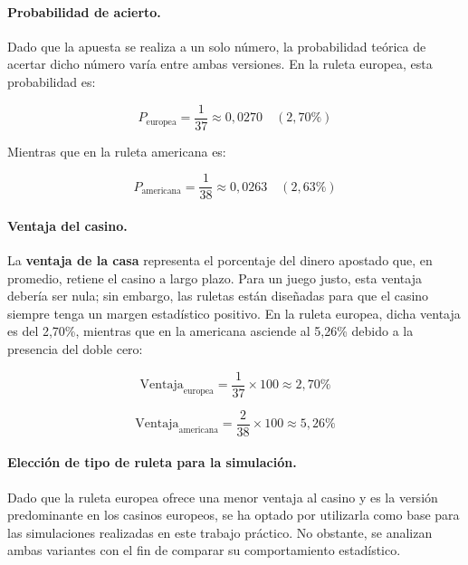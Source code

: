 \documentclass{article}
\begin{document}
\paragraph{Probabilidad de acierto.}
Dado que la apuesta se realiza a un solo número, la probabilidad teórica de acertar dicho número varía entre ambas versiones. En la ruleta europea, esta probabilidad es:

\begin{equation}
    P_{\text{europea}} = \frac{1}{37} \approx 0{,}0270 \quad (2{,}70\%)
\end{equation}

Mientras que en la ruleta americana es:

\begin{equation}
    P_{\text{americana}} = \frac{1}{38} \approx 0{,}0263 \quad (2{,}63\%)
\end{equation}

\paragraph{Ventaja del casino.}
La \textbf{ventaja de la casa} representa el porcentaje del dinero apostado que, en promedio, retiene el casino a largo plazo. Para un juego justo, esta ventaja debería ser nula; sin embargo, las ruletas están diseñadas para que el casino siempre tenga un margen estadístico positivo. En la ruleta europea, dicha ventaja es del 2,70\%, mientras que en la americana asciende al 5,26\% debido a la presencia del doble cero:

\begin{equation}
    \text{Ventaja}_{\text{europea}} = \frac{1}{37} \times 100 \approx 2{,}70\%
\end{equation}

\begin{equation}
    \text{Ventaja}_{\text{americana}} = \frac{2}{38} \times 100 \approx 5{,}26\%
\end{equation}

\paragraph{Elección de tipo de ruleta para la simulación.}
Dado que la ruleta europea ofrece una menor ventaja al casino y es la versión predominante en los casinos europeos, se ha optado por utilizarla como base para las simulaciones realizadas en este trabajo práctico. No obstante, se analizan ambas variantes con el fin de comparar su comportamiento estadístico.
\end{document}
